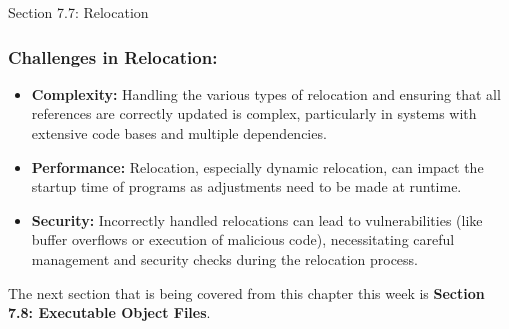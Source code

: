 \begin{notes}{Section 7.7: Relocation}
    \subsubsection*{Challenges in Relocation:}
    
    \begin{itemize}
        \item \textbf{Complexity:} Handling the various types of relocation and ensuring that all references are correctly updated is complex, particularly in systems with extensive code bases and multiple dependencies.
        \item \textbf{Performance:} Relocation, especially dynamic relocation, can impact the startup time of programs as adjustments need to be made at runtime.
        \item \textbf{Security:} Incorrectly handled relocations can lead to vulnerabilities (like buffer overflows or execution of malicious code), necessitating careful management and security checks 
        during the relocation process.
    \end{itemize}
\end{notes}

The next section that is being covered from this chapter this week is \textbf{Section 7.8: Executable Object Files}.

